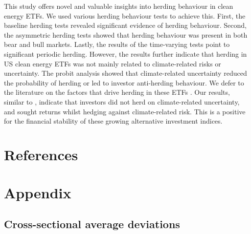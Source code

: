 \documentclass[
  letterpaper,
  DIV=11,
  numbers=noendperiod]{scrartcl}
\begin{document}
This study offers novel and valuable insights into herding behaviour in
clean energy ETFs. We used various herding behaviour tests to achieve
this. First, the baseline herding tests revealed significant evidence of
herding behaviour. Second, the asymmetric herding tests showed that
herding behaviour was present in both bear and bull markets. Lastly, the
results of the time-varying tests point to significant periodic herding.
However, the results further indicate that herding in US clean energy
ETFs was not mainly related to climate-related risks or uncertainty. The
probit analysis showed that climate-related uncertainty reduced the
probability of herding or led to investor anti-herding behaviour. We
defer to the literature on the factors that drive herding in these ETFs
\citep[for example,][]{loang2023, koutmos2024, przychodzen2016}. Our
results, similar to \citet{bua2024}, indicate that investors did not
herd on climate-related uncertainty, and sought returns whilst hedging
against climate-related risk. This is a positive for the financial
stability of these growing alternative investment indices.

\newpage

\section*{References}\label{references}

\renewcommand{\bibsection}{}


\setcounter{section}{0}
\renewcommand{\thesection}{\Alph{section}}

\setcounter{table}{0}
\renewcommand{\thetable}{A\arabic{table}}

\setcounter{figure}{0}
\renewcommand{\thefigure}{A\arabic{figure}}

\newpage

\section{Appendix}\label{appendix}

\subsection{Cross-sectional average
deviations}\label{cross-sectional-average-deviations}
\end{document}
